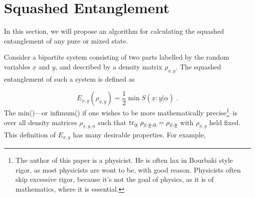 \documentclass[12pt]{article}%
\newcommand{\tr}[0]{{\rm tr }}
\newcommand{\beq}{\begin{equation}}
\newcommand{\eeq}{\end{equation}}
\newcommand{\ul}[1]{\underline{#1}}
\newcommand{\rvx}[0]{{\ul{x}}}
\newcommand{\rvy}[0]{{\ul{y}}}
\newcommand{\rvalp}[0]{{\ul{\alpha}}}
\begin{document}
\section{Squashed Entanglement}
\label{sec-squashed}
In this section, we will
propose an algorithm for
calculating the squashed entanglement
of any pure or mixed state.


Consider a bipartite system
consisting of two parts labelled
by the random variables $\rvx$ and $\rvy$,
and
described by a density matrix $\rho_{\rvx, \rvy}$.
The squashed entanglement of  such a system
is defined as

\beq
E_{\rvx, \rvy}(\rho_{\rvx, \rvy}) =
\frac{1}{2}
\min S(\rvx : \rvy|\rvalp)
\;.
\eeq
The min()---or infimum()
if one wishes to be more mathematically
precise\footnote{The author
of this paper is a physicist. He is
often lax in Bourbaki style rigor, as most physicists are wont to be,
with good reason.  Physicists often
 skip excessive rigor, because it's not the goal of physics,
 as it is of mathematics, where it is essential.}--is
over all density matrices $\rho_{\rvx, \rvy,\rvalp}$
such that $\tr_\rvalp \; \rho_{\rvx, \rvy,\rvalp}=
\rho_{\rvx, \rvy}$ with $\rho_{\rvx, \rvy}$ held fixed.
This definition of $E_{\rvx,\rvy}$
has many desirable properties. For example,
\end{document}
